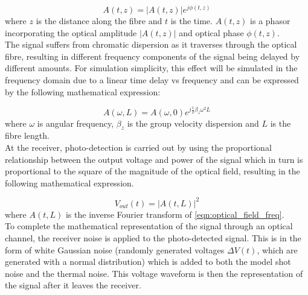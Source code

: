         \begin{equation}
            \label{eqn:optical_field_time}
            A(t, z) = |A(t,z)|e^{j\phi(t,z)}
        \end{equation}
        where $z$ is the distance along the fibre and $t$ is the time. $A(t,z)$ is a phasor incorporating the optical amplitude $|A(t,z)|$ and optical phase $\phi(t,z)$.
        \\
        
        The signal suffers from chromatic dispersion as it traverses through the optical fibre, resulting in different frequency components of the signal being delayed by different amounts. For simulation simplicity, this effect will be simulated in the frequency domain due to a linear time delay vs frequency and can be expressed by the following mathematical expression:
        
        \begin{equation}
            \label{eqn:optical_field_freq}
            A(\omega,L) = A(\omega,0)e^{j\frac{1}{2}\beta_z\omega^2L}
        \end{equation}
        where $\omega$ is angular frequency, $\beta_z$ is the group velocity dispersion and $L$ is the fibre length.
        \\
        
        At the receiver, photo-detection is carried out by using the proportional relationship between the output voltage and power of the signal which in turn is proportional to the square of the magnitude of the optical field, resulting in the following mathematical expression.
        
        \begin{equation}
            \label{eqn:squared_law_detection}
            V_{out}(t) = |A(t,L)|^2
        \end{equation}
        where $A(t,L)$ is the inverse Fourier transform of \autoref{eqn:optical_field_freq}.
        \\
        
        To complete the mathematical representation of the signal through an optical channel, the receiver noise is applied to the photo-detected signal. This is in the form of white Gaussian noise (randomly generated voltages $\Delta V(t)$, which are generated with a normal distribution) which is added to both the model shot noise and the thermal noise. This voltage waveform is then the representation of the signal after it leaves the receiver.
        \\
        
